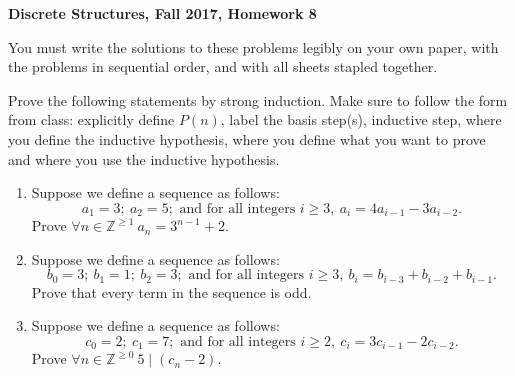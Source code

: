\documentclass[11pt, letterpaper]{report}
\newcommand{\Z}{\mathbb{Z}}
\begin{document}
{\textbf{Discrete Structures, Fall 2017, Homework 8}}

\bigskip

You must write the solutions to these problems legibly on your own paper, with
the problems in sequential order, and with all sheets stapled together.

\bigskip

Prove the following statements by strong induction.  Make sure to follow the form from class:
explicitly define $P(n)$, label the basis step(s), inductive step, where you define the inductive hypothesis, where you define what you want to prove
and where you use the inductive hypothesis.  
\begin{enumerate}

\item Suppose we define a sequence as follows: 
$$
a_1 = 3; \ a_2 = 5; \text{ and for all integers }i \geq 3, \ a_i = 4a_{i-1} -3a_{i-2}. 
$$
Prove $\forall n \in \Z^{\geq 1} \ a_n = 3^{n-1}+2.$

\item Suppose we define a sequence as follows: 
$$
b_0 = 3; \ b_1 = 1; \ b_2 = 3; \text{ and for all integers }i \geq 3, \ b_i = b_{i-3} + b_{i-2}  +b_{i-1}. 
$$
Prove that every term in the sequence is odd.


\item Suppose we define a sequence as follows: 
$$
c_0 = 2; \ c_1=7; \text{ and for all integers }i \geq 2, \ c_i = 3c_{i-1} -2c_{i-2}. 
$$
Prove $\forall n \in \Z^{\geq 0} \ 5 \mid (c_n - 2)$.






\end{enumerate}
\end{document}
